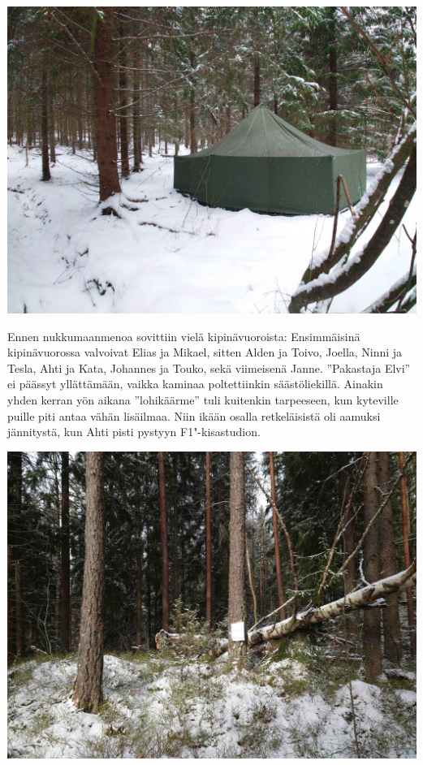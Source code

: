 \begin{multicols}{2}
	\vspace*{0.16cm}
	\noindent\includegraphics[width=\linewidth]{assets/olionpaluu2}

	Ennen nukkumaanmenoa sovittiin vielä kipinävuoroista: Ensimmäisinä
	kipinävuorossa valvoivat Elias ja Mikael, sitten Alden ja Toivo,
	Joella, Ninni ja Tesla, Ahti ja Kata, Johannes ja Touko, sekä
	viimeisenä Janne. ''Pakastaja Elvi'' ei päässyt yllättämään, vaikka
	kaminaa poltettiinkin säästöliekillä. Ainakin yhden kerran yön aikana
	''lohikäärme'' tuli kuitenkin tarpeeseen, kun kyteville puille piti antaa
	vähän lisäilmaa. Niin ikään osalla retkeläisistä oli aamuksi
	jännitystä, kun Ahti pisti pystyyn F1"-kisastudion.

	\vspace*{0.16cm}
	\noindent\includegraphics[width=\linewidth]{assets/olionpaluu4}


\end{multicols}
